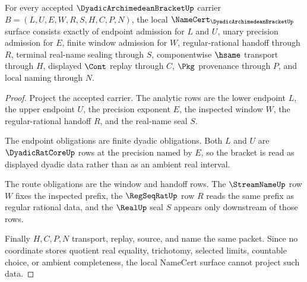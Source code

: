 \begin{theorem}
\label{thm:dyadic-archimedean-bracket-namecert-obligations}
For every accepted $\DyadicArchimedeanBracketUp$ carrier $B=(L,U,E,W,R,S,H,C,P,N)$, the local $\NameCert_{\DyadicArchimedeanBracketUp}$ surface consists exactly of endpoint admission for $L$ and $U$, unary precision admission for $E$, finite window admission for $W$, regular-rational handoff through $R$, terminal real-name sealing through $S$, componentwise $\hsame$ transport through $H$, displayed $\Cont$ replay through $C$, $\Pkg$ provenance through $P$, and local naming through $N$.
\end{theorem}
\begin{proof}
Project the accepted carrier. The analytic rows are the lower endpoint $L$, the upper endpoint $U$, the precision exponent $E$, the inspected window $W$, the regular-rational handoff $R$, and the real-name seal $S$.

The endpoint obligations are finite dyadic obligations. Both $L$ and $U$ are $\DyadicRatCoreUp$ rows at the precision named by $E$, so the bracket is read as displayed dyadic data rather than as an ambient real interval.

The route obligations are the window and handoff rows. The $\StreamNameUp$ row $W$ fixes the inspected prefix, the $\RegSeqRatUp$ row $R$ reads the same prefix as regular rational data, and the $\RealUp$ seal $S$ appears only downstream of those rows.

Finally $H,C,P,N$ transport, replay, source, and name the same packet. Since no coordinate stores quotient real equality, trichotomy, selected limits, countable choice, or ambient completeness, the local NameCert surface cannot project such data.
\end{proof}

